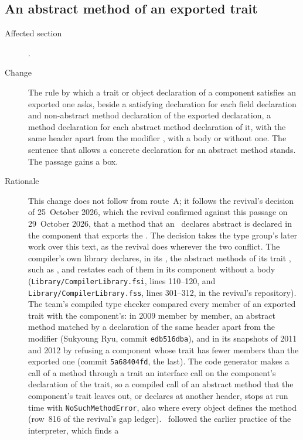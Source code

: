 \subsection{An abstract method of an exported trait}

\begin{description}
\item[Affected section] .
\item[Change] The rule by which a trait or object declaration of a component
satisfies an exported one asks, beside a satisfying declaration for each field
declaration and non-abstract method declaration of the exported declaration, a
method declaration for each abstract method declaration of it, with the same
header apart from the modifier , with a body or without one.
The sentence that allows a concrete declaration for an abstract method stands.
The passage gains a box.
\item[Rationale] This change does not follow from route~A; it follows the
revival's decision of 25~October 2026, which the revival confirmed against this
passage on 29~October 2026, that a method that an \apiN\ declares abstract is
declared in the component that exports the \apiN.
The decision takes the type group's later work over this text, as the revival
does wherever the two conflict.
The compiler's own library declares, in its \apiN, the abstract methods of its
trait , such as , and restates each of them in its
component without a body
(\nolinkurl{Library/CompilerLibrary.fsi}, lines 110--120, and
\nolinkurl{Library/CompilerLibrary.fss}, lines 301--312, in the revival's
repository).
The team's compiled type checker compared every member of an exported trait
with the component's: in 2009 member by member, an abstract method matched
by a declaration of the same header apart from the modifier 
(Sukyoung Ryu, commit \texttt{edb516dba}), and in its snapshots of 2011 and
2012 by refusing a component whose trait has fewer members than the
exported one (commit \texttt{5a68404fd}, the last).
The code generator makes a call of a method through a trait an interface call
on the component's declaration of the trait, so a compiled call of an abstract
method that the component's trait leaves out, or declares at another header,
stops at run time with \texttt{NoSuchMethodError}, also where every object
defines the method (row~816 of the revival's gap ledger).
\Library\ followed the earlier practice of the interpreter, which finds a

\end{description}
